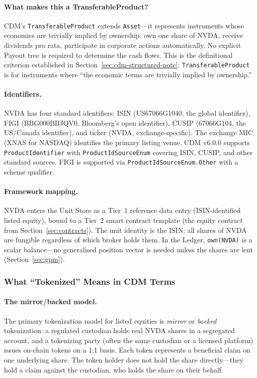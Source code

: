 \documentclass[11pt,a4paper]{article}
\begin{document}
\paragraph{What makes this a TransferableProduct?} CDM's \texttt{TransferableProduct} extends \texttt{Asset}---it represents instruments whose economics are trivially implied by ownership: own one share of NVDA, receive dividends pro rata, participate in corporate actions automatically. No explicit Payout tree is required to determine the cash flows. This is the definitional criterion established in Section~\ref{sec:cdm-structured-note}: \texttt{TransferableProduct} is for instruments where ``the economic terms are trivially implied by ownership.''

\paragraph{Identifiers.} NVDA has four standard identifiers: ISIN (US67066G1040, the global identifier), FIGI (BBG000BBJQV0, Bloomberg's open identifier), CUSIP (67066G104, the US/Canada identifier), and ticker (NVDA, exchange-specific). The exchange MIC (XNAS for NASDAQ) identifies the primary listing venue. CDM v6.0.0 supports \texttt{ProductIdentifier} with \texttt{ProductIdSourceEnum} covering ISIN, CUSIP, and other standard sources. FIGI is supported via \texttt{ProductIdSourceEnum.Other} with a scheme qualifier.

\paragraph{Framework mapping.} NVDA enters the Unit Store as a Tier~1 reference data entry (ISIN-identified listed equity), bound to a Tier~2 smart contract template (the equity contract from Section~\ref{sec:contracts}). The unit identity is the ISIN: all shares of NVDA are fungible regardless of which broker holds them. In the Ledger, \texttt{own(NVDA)} is a scalar balance---no generalised position vector is needed unless the shares are lent (Section~\ref{sec:gpm}).

\subsubsection{What ``Tokenized'' Means in CDM Terms}
\label{sec:cdm-tokenized-meaning}

\paragraph{The mirror/backed model.} The primary tokenization model for listed equities is \emph{mirror} or \emph{backed} tokenization: a regulated custodian holds real NVDA shares in a segregated account, and a tokenizing party (often the same custodian or a licensed platform) issues on-chain tokens on a 1:1 basis. Each token represents a beneficial claim on one underlying share. The token holder does not hold the share directly---they hold a claim against the custodian, who holds the share on their behalf.
\end{document}
